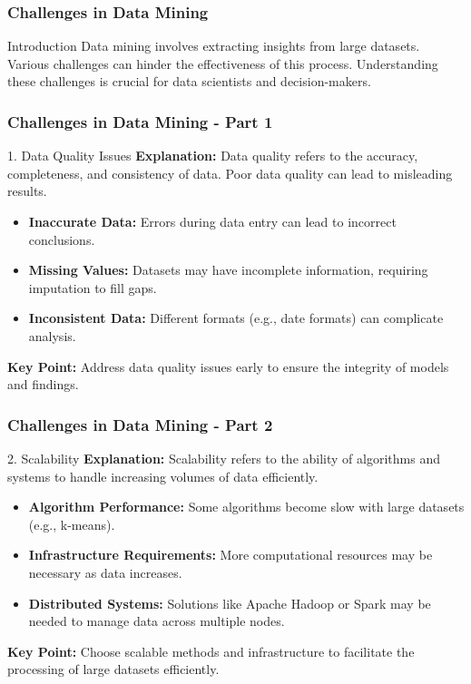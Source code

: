\documentclass[aspectratio=169]{beamer}
\begin{document}
\begin{frame}[fragile]
    \frametitle{Challenges in Data Mining}
    \begin{block}{Introduction}
        Data mining involves extracting insights from large datasets. Various challenges can hinder the effectiveness of this process. 
        Understanding these challenges is crucial for data scientists and decision-makers.
    \end{block}
\end{frame}

\begin{frame}[fragile]
    \frametitle{Challenges in Data Mining - Part 1}
    \begin{block}{1. Data Quality Issues}
        \textbf{Explanation:} Data quality refers to the accuracy, completeness, and consistency of data. Poor data quality can lead to misleading results. 

        \begin{itemize}
            \item \textbf{Inaccurate Data:} Errors during data entry can lead to incorrect conclusions.
            \item \textbf{Missing Values:} Datasets may have incomplete information, requiring imputation to fill gaps.
            \item \textbf{Inconsistent Data:} Different formats (e.g., date formats) can complicate analysis.
        \end{itemize}

        \textbf{Key Point:} Address data quality issues early to ensure the integrity of models and findings.
    \end{block}
\end{frame}

\begin{frame}[fragile]
    \frametitle{Challenges in Data Mining - Part 2}
    \begin{block}{2. Scalability}
        \textbf{Explanation:} Scalability refers to the ability of algorithms and systems to handle increasing volumes of data efficiently.

        \begin{itemize}
            \item \textbf{Algorithm Performance:} Some algorithms become slow with large datasets (e.g., k-means).
            \item \textbf{Infrastructure Requirements:} More computational resources may be necessary as data increases.
            \item \textbf{Distributed Systems:} Solutions like Apache Hadoop or Spark may be needed to manage data across multiple nodes.
        \end{itemize}

        \textbf{Key Point:} Choose scalable methods and infrastructure to facilitate the processing of large datasets efficiently.
    \end{block}
\end{frame}
\end{document}
